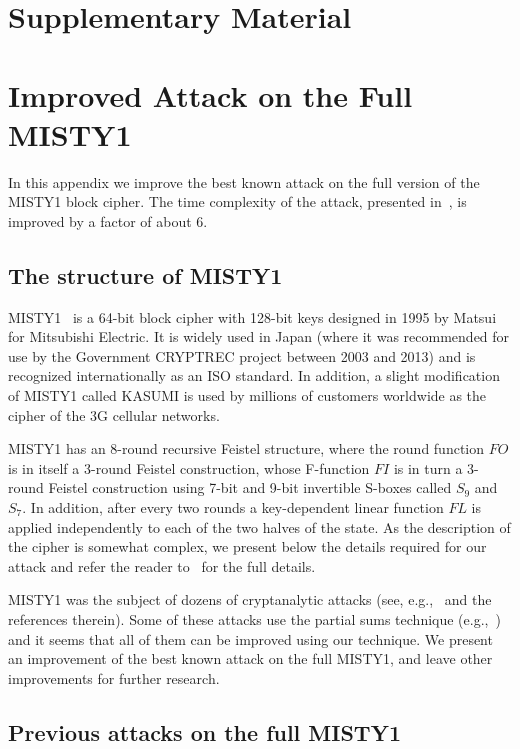 \section*{Supplementary Material}

\section{Improved Attack on the Full MISTY1}\label{app:misty1}

In this appendix we improve the best known attack on the full version of the MISTY1 block cipher. The time complexity of the attack, presented in~\cite{C:BarKel16}, is improved by a factor of about 6.

\subsection{The structure of MISTY1} 

MISTY1~\cite{MISTY1} is a 64-bit block cipher with 128-bit keys designed in 1995 by
Matsui for Mitsubishi Electric. It is widely used in Japan (where it was recommended for use by the Government CRYPTREC project between 2003 and 2013) and is recognized internationally as an ISO standard. In addition, a slight modification of MISTY1 called KASUMI is used by millions of customers worldwide as the cipher of the 3G cellular networks.

MISTY1 has an 8-round recursive Feistel structure, where the round function $FO$ is in itself a 3-round Feistel construction, whose F-function $FI$ is in turn a 3-
round Feistel construction using 7-bit and 9-bit invertible S-boxes called $S_9$ and $S_7$. In addition, after every two rounds a key-dependent linear function $FL$ is applied independently to each of the two halves of the state. As the description of the cipher is somewhat complex, we present below the details required for our attack and refer the reader to~\cite{MISTY1} for the full details.

MISTY1 was the subject of dozens of cryptanalytic attacks (see, e.g.,~\cite{C:BarKel16} and the references therein). Some of these attacks use the partial sums technique (e.g.,~\cite{C:BarKel16,DESI:DunKel15,JC:Todo17}) and it seems that all of them can be improved using our technique. We present an improvement of the best known attack on the full MISTY1, and leave other improvements for further research.

\subsection{Previous attacks on the full MISTY1} 

